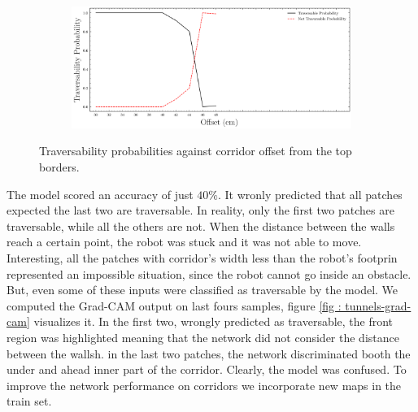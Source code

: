 \begin{figure}[htbp]
    \centering
\begin{subfigure}[b]{1\linewidth}
    \includegraphics[width=\linewidth]{../img/5/custom_patches/tunnel/predictions.png}
    \end{subfigure}
    \caption{Traversability probabilities against corridor offset from the top borders.}
    \label{fig : tunnels-preds}
\end{figure}
The model scored an accuracy of just $40\%$. It wronly predicted that all patches expected the last two are traversable. In reality, only the first two patches are traversable, while all the others are not. When the distance between the walls reach a certain point, the robot was stuck and it was not able to move. Interesting, all the patches with corridor's width less than the robot's footprin represented an impossible situation, since the robot cannot go inside an obstacle. But, even some of these inputs were classified as traversable by the model. We computed the Grad-CAM output on last fours samples, figure \ref{fig : tunnels-grad-cam} visualizes it. In the first two, wrongly predicted as traversable, the front region was highlighted meaning that the network did not consider the distance between the wallsh. in the last two patches, the network discriminated booth the under and ahead inner part of the corridor. Clearly, the model was confused. To improve the network performance on corridors we incorporate new maps in the train set.
